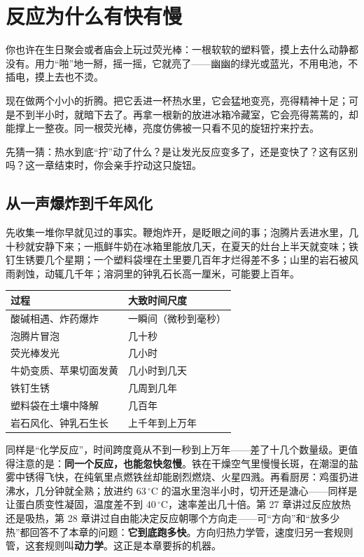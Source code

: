 \chapter{反应为什么有快有慢}

\begin{kaichang}
你也许在生日聚会或者庙会上玩过荧光棒：一根软软的塑料管，摸上去什么动静都没有。用力“啪”地一掰，摇一摇，它就亮了——幽幽的绿光或蓝光，不用电池，不插电，摸上去也不烫。

现在做两个小小的折腾。把它丢进一杯热水里，它会猛地变亮，亮得精神十足；可是不到半小时，就暗下去了。再拿一根新的放进冰箱冷藏室，它会亮得蔫蔫的，却能撑上一整夜。同一根荧光棒，亮度仿佛被一只看不见的旋钮拧来拧去。

先猜一猜：热水到底“拧”动了什么？是让发光反应变多了，还是变快了？这有区别吗？这一章结束时，你会亲手拧动这只旋钮。
\end{kaichang}

\section{从一声爆炸到千年风化}

先收集一堆你早就见过的事实。鞭炮炸开，是眨眼之间的事；泡腾片丢进水里，几十秒就安静下来；一瓶鲜牛奶在冰箱里能放几天，在夏天的灶台上半天就变味；铁钉生锈要几个星期；一个塑料袋埋在土里要几百年才烂得差不多；山里的岩石被风雨剥蚀，动辄几千年；溶洞里的钟乳石长高一厘米，可能要上百年。

\begin{table}[htbp]
\centering
\begin{tabular}{ll}
\toprule
\textbf{过程} & \textbf{大致时间尺度}\\
\midrule
酸碱相遇、炸药爆炸 & 一瞬间（微秒到毫秒）\\
泡腾片冒泡 & 几十秒\\
荧光棒发光 & 几小时\\
牛奶变质、苹果切面发黄 & 几小时到几天\\
铁钉生锈 & 几周到几年\\
塑料袋在土壤中降解 & 几百年\\
岩石风化、钟乳石生长 & 上千年到上万年\\
\bottomrule
\end{tabular}
\end{table}

同样是“化学反应”，时间跨度竟从不到一秒到上万年——差了十几个数量级。更值得注意的是：\textbf{同一个反应，也能忽快忽慢}。铁在干燥空气里慢慢长斑，在潮湿的盐雾中锈得飞快，在纯氧里点燃铁丝却能剧烈燃烧、火星四溅。再看厨房：鸡蛋扔进沸水，几分钟就全熟；放进约 $63\,^{\circ}\mathrm{C}$ 的温水里泡半小时，切开还是溏心——同样是让蛋白质变性凝固，温度差不到 $40\,^{\circ}\mathrm{C}$，速率差出几十倍。第 27 章讲过反应放热还是吸热，第 28 章讲过自由能决定反应朝哪个方向走——可“方向”和“放多少热”都回答不了本章的问题：\textbf{它到底跑多快}。方向归热力学管，速度归另一套规则管，这套规则叫\textbf{动力学}。这正是本章要拆的机器。

